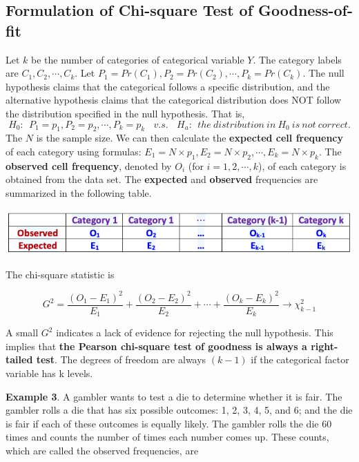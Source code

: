 \documentclass[
]{book}
\begin{document}
\hypertarget{formulation-of-chi-square-test-of-goodness-of-fit}{%
\subsection{Formulation of Chi-square Test of Goodness-of-fit}\label{formulation-of-chi-square-test-of-goodness-of-fit}}

Let \(k\) be the number of categories of categorical variable \(Y\). The category labels are \(C_1, C_2, \cdots, C_k\). Let \(P_1 = Pr(C_1), P_2 = Pr(C_2), \cdots, P_k = Pr(C_k)\). The null hypothesis claims that the categorical follows a specific distribution, and the alternative hypothesis claims that the categorical distribution does NOT follow the distribution specified in the null hypothesis. That is,
\[
H_0:\ \ P_1 = p_1, P_2 = p_2, \cdots, P_k = p_k \ \ \ \ v.s. \  \  \  \  H_a: \ \ the \ distribution \ in \ H_0 \ is \ not \ correct.
\]
The \(N\) is the sample size. We can then calculate the \textbf{expected cell frequency} of each category using formulas: \(E_1 = N\times p_1, E_2 = N \times p_2, \cdots, E_k = N \times p_k\). The \textbf{observed cell frequency}, denoted by \(O_i\) (for \(i=1,2, \cdots, k\)), of each category is obtained from the data set. The \textbf{expected} and \textbf{observed} frequencies are summarized in the following table.

\begin{center}\includegraphics[width=0.6\linewidth]{week13/obsExpTable} \end{center}

The chi-square statistic is

\[
G^2 = \frac{(O_1-E_1)^2}{E_1} + \frac{(O_2-E_2)^2}{E_2} + \cdots + \frac{(O_k-E_k)^2}{E_k} \to \chi_{k-1}^2
\]

A small \(G^2\) indicates a lack of evidence for rejecting the null hypothesis. This implies that \textbf{the Pearson chi-square test of goodness is always a right-tailed test}.
The degrees of freedom are always \((k-1)\) if the categorical factor variable has k levels.

\textbf{Example 3}. A gambler wants to test a die to determine whether it is fair. The gambler rolls a die that has six possible outcomes: 1, 2, 3, 4, 5, and 6; and the die is fair if each of these outcomes is equally likely. The gambler rolls the die 60 times and counts the number of times each number comes up. These counts, which are called the observed frequencies, are
\end{document}
